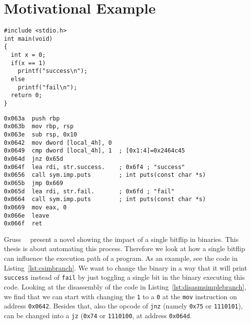 \section{Motivational Example}\label{sec:motivation}

\begin{minipage}{\linewidth}
\begin{lstlisting}[style=CStyle,
                   caption={Simple branching code to illustrate how a single
bitflip can change the execution path.},
                   label={lst:csimbranch}]
#include <stdio.h>
int main(void)
{
  int x = 0;
  if(x == 1)
    printf("success\n");
  else
    printf("fail\n");
  return 0;
}
\end{lstlisting}
\end{minipage}

\begin{minipage}{\linewidth}
\begin{lstlisting}[style=nasm,
                   caption={Disassemby of the main function created by the
code in Listing~\ref{lst:csimbranch}. Shows disassembly at the given address
range inside the ELF file, starting at \texttt{0x063a}.},
                   label={lst:disasmsimplebranch}]
0x063a  push rbp
0x063b  mov rbp, rsp
0x063e  sub rsp, 0x10
0x0642  mov dword [local_4h], 0
0x0649  cmp dword [local_4h], 1  ; [0x1:4]=0x2464c45
0x064d  jnz 0x65d
0x064f  lea rdi, str.success.    ; 0x6f4 ; "success"
0x0656  call sym.imp.puts        ; int puts(const char *s)
0x065b  jmp 0x669
0x065d  lea rdi, str.fail.       ; 0x6fd ; "fail"
0x0664  call sym.imp.puts        ; int puts(const char *s)
0x0669  mov eax, 0
0x066e  leave
0x066f  ret
\end{lstlisting}
\end{minipage}

Gruss~\etal~\cite{flipinthewall} present a novel showing the impact of a single
bitflip in binaries. This thesis is about automating this process. Therefore we
look at how a single bitflip can influence the execution path of a program. As
an example, see the code in Listing~\ref{lst:csimbranch}. We want to change the
binary in a way that it will print \texttt{success} instead of \texttt{fail} by
just toggling a single bit in the binary executing this code. Looking at the
disassembly of the code in Listing~\ref{lst:disasmsimplebranch}, we find that we
can start with changing the \texttt{1} to a \texttt{0} at the \texttt{mov}
instruction on address \texttt{0x0642}. Besides that, also the opcode of
\texttt{jnz} (namely \texttt{0x75}  or \texttt{1110101}), can be changed into a
\texttt{jz} (\texttt{0x74} or \texttt{1110100}, at address \texttt{0x064d}.


